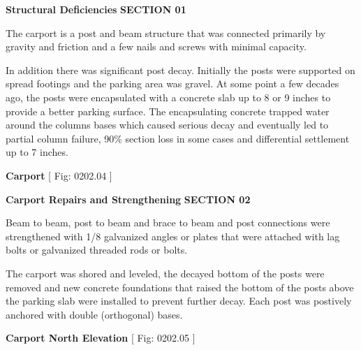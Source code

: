 \documentclass[12pt,notitle,letterpaper]{report}
\begin{document}
\setcounter{page}{21}


\vspace{.2in}   \textbf{Structural Deficiencies}   \hfill\textbf{SECTION 01}
\newline   \vspace{.05in}   {\color{black}\hrulefill}

The carport is a post and beam structure that was connected primarily by
gravity and friction and a few nails and screws with minimal capacity.

In addition there was significant post decay. Initially the posts were
supported on spread footings and the parking area was gravel. At some point
a few decades ago, the posts were encapsulated with a concrete slab up to 8
or 9 inches to provide a better parking surface. The encapsulating concrete
trapped water around the columns bases which caused serious decay and
eventually led to partial column failure, 90\% section loss in some cases
and differential settlement up to 7 inches.


\textbf{Carport} \hfill {[} Fig: 0202.04 {]}

\vspace{.2in}   \textbf{Carport Repairs and Strengthening}   \hfill\textbf{SECTION 02}
\newline   \vspace{.05in}   {\color{black}\hrulefill}

Beam to beam, post to beam and brace to beam and post connections were
strengthened with 1/8\textquotedbl{} galvanized angles or plates that were attached with
lag bolts or galvanized threaded rods or bolts.

The carport was shored and leveled, the decayed bottom of the posts were
removed and new concrete foundations that raised the bottom of the posts
above the parking slab were installed to prevent further decay.  Each post
was postively anchored with double (orthogonal) bases.


\textbf{Carport North Elevation} \hfill {[} Fig: 0202.05 {]}

\end{document}
